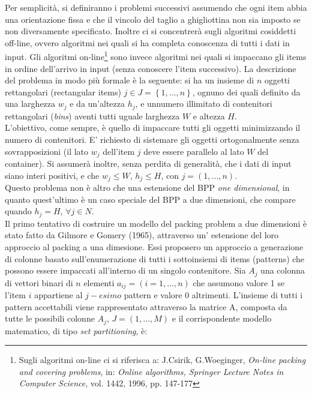 \documentclass[12pt,a4paper,openright,twoside]{report}
\begin{document}
Per semplicit\`{a}, si definiranno i problemi successivi assumendo che ogni item abbia una orientazione fissa e che il vincolo del taglio a ghigliottina non sia imposto se non diversamente specificato. Inoltre ci si concentrer\`{a} sugli algoritmi cosiddetti off-line, ovvero algoritmi nei quali si ha completa conoscenza di tutti i dati in input. Gli algoritmi on-line\footnote{Sugli algoritmi on-line ci si riferisca a: J.Csirik, G.Woeginger, \textit{On-line packing and covering problems}, in: \textit{Online algorithms, Springer Lecture Notes in Computer Science}, vol. 1442, 1996, pp. 147-177
} sono invece algoritmi nei quali si impaccano gli items in ordine dell'arrivo in input (senza conoscere l'item successivo).
La descrizione del problema in modo pi\`{u} formale \`{e} la seguente: si ha un insieme di $n$ oggetti rettangolari (rectangular items) $j \in J = \left\lbrace 1,...,n \right\rbrace$, ognuno dei quali definito da una larghezza $w_{j}$ e da un'altezza $h_{j}$, e unnumero illimitato di contenitori rettangolari (\textit{bins}) aventi tutti uguale larghezza $W$ e altezza $H$.  \\
L'obiettivo, come sempre, \`{e} quello di impaccare tutti gli oggetti minimizzando il numero di contenitori. E' richiesto di sistemare gli oggetti ortogonalmente senza sovrapposizioni (il lato $w_{j}$ dell'item $j$ deve essere parallelo al lato $W$ del container).
Si assumer\`{a} inoltre, senza perdita di generalit\`{a}, che i dati di input siano interi positivi, e che $w_{j} \leq W$, $h_{j} \leq H$, con $j = (1,...,n)$.\\
Questo problema non \`{e} altro che una estensione del BPP \textit{one dimensional}, in quanto quest'ultimo \`{e} un caso speciale del BPP a due dimensioni, che compare quando $h_{j} = H$, $\forall j \in N$.\\
Il primo tentativo di costruire un modello del packing problem a due dimensioni \`{e} stato fatto da Gilmore e Gomery (1965), attraverso un' estensione del loro approccio al packing a una dimesione. Essi proposero un approccio a generazione di colonne basato sull'enumerazione di tutti i sottoinsiemi di items (patterns) che possono essere impaccati all'interno di un singolo contenitore. Sia $A_{j}$ una colonna di vettori binari di $n$ elementi $a_{ij} = (i = 1,...,n)$ che assumono valore 1 se l'item $i$ appartiene al $j-esimo$ pattern e valore 0 altrimenti.                              L'insieme di tutti i pattern accettabili viene rappresentato attraverso la matrice A, composta da tutte le possibili colonne $A_{j}$, $J = (1,...,M)$                                                                 e il corrispondente modello matematico, di tipo \textit{set partitioning}, \`{e}:
\end{document}

